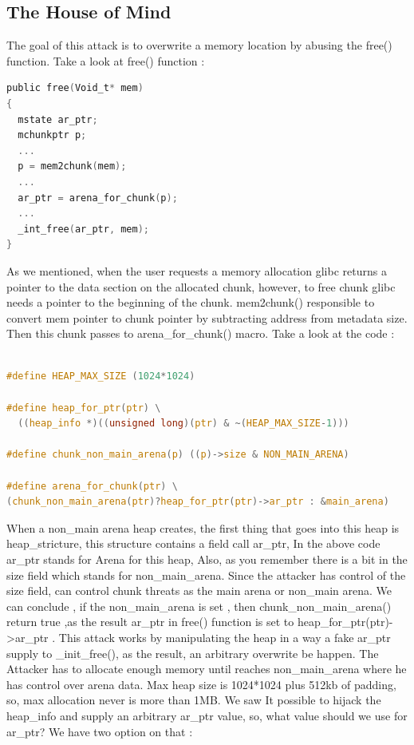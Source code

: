 \documentclass{masterthesis}
\newcommand*\libc{glibc}
\begin{document}
\subsection{The House of Mind}
The goal of this attack is to overwrite a memory location by abusing the free() function. Take a look at free() function : 
\begin{lstlisting}[language=c,frame=tlrb]
public free(Void_t* mem)
{
  mstate ar_ptr;
  mchunkptr p;    
  ...
  p = mem2chunk(mem);
  ...
  ar_ptr = arena_for_chunk(p);
  ...
  _int_free(ar_ptr, mem);
}
 \end{lstlisting}
As we mentioned, when the user requests a memory allocation \libc{} returns a pointer to the data section on the allocated chunk, however, to free chunk \libc{} needs a pointer to the beginning of the chunk. mem2chunk() responsible to convert mem pointer to chunk pointer by subtracting address from metadata size. Then this chunk passes to arena\_for\_chunk() macro. Take a look at the code : 
\begin{lstlisting}[language=c,frame=tlrb]

#define HEAP_MAX_SIZE (1024*1024)

#define heap_for_ptr(ptr) \
  ((heap_info *)((unsigned long)(ptr) & ~(HEAP_MAX_SIZE-1)))

#define chunk_non_main_arena(p) ((p)->size & NON_MAIN_ARENA)

#define arena_for_chunk(ptr) \
(chunk_non_main_arena(ptr)?heap_for_ptr(ptr)->ar_ptr : &main_arena)
 \end{lstlisting}
When a non\_main arena heap creates, the first thing that goes into this heap is heap\_stricture, this structure contains a field call ar\_ptr, In the above code ar\_ptr stands for Arena for this heap, Also, as you remember there is a bit in the size field which stands for non\_main\_arena. Since the attacker has control of the size field, can control chunk threats as the main arena or non\_main arena. We can conclude , if the non\_main\_arena is set , then chunk\_non\_main\_arena() return true ,as the result ar\_ptr in free() function is set to heap\_for\_ptr(ptr)->ar\_ptr .
This attack works by manipulating the heap in a way a fake ar\_ptr supply to \_init\_free(), as the result, an arbitrary overwrite be happen. The Attacker has to allocate enough memory until reaches non\_main\_arena where he has control over arena data. Max heap size is 1024*1024 plus 512kb of padding, so, max allocation never is more than 1MB.
We saw It possible to hijack the heap\_info and supply an arbitrary ar\_ptr value, so, what value should we use for ar\_ptr? We have two option on that :
\end{document}
